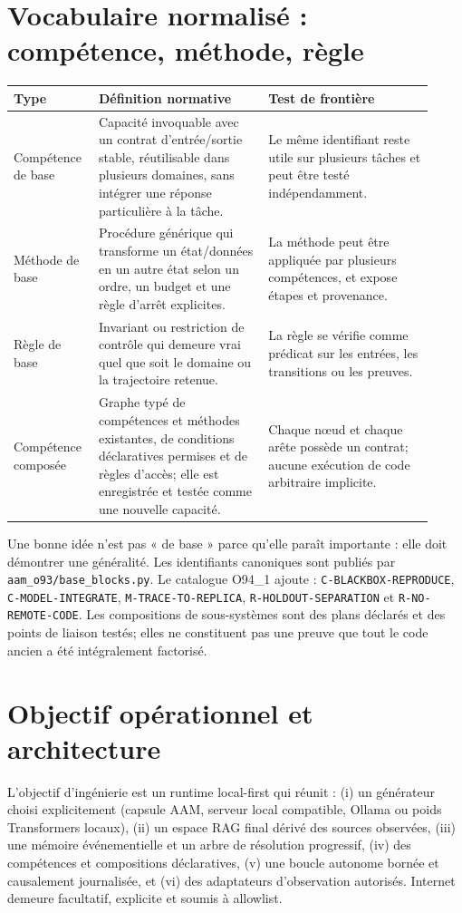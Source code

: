 \documentclass[11pt,a4paper]{article}
\begin{document}
\section{Vocabulaire normalisé : compétence, méthode, règle}
\begin{longtable}{p{0.17\linewidth}p{0.38\linewidth}p{0.37\linewidth}}
\toprule
Type & Définition normative & Test de frontière \\
\midrule
Compétence de base & Capacité invoquable avec un contrat d'entrée/sortie stable, réutilisable dans plusieurs domaines, sans intégrer une réponse particulière à la tâche. & Le même identifiant reste utile sur plusieurs tâches et peut être testé indépendamment. \\
Méthode de base & Procédure générique qui transforme un état/données en un autre état selon un ordre, un budget et une règle d'arrêt explicites. & La méthode peut être appliquée par plusieurs compétences, et expose étapes et provenance. \\
Règle de base & Invariant ou restriction de contrôle qui demeure vrai quel que soit le domaine ou la trajectoire retenue. & La règle se vérifie comme prédicat sur les entrées, les transitions ou les preuves. \\
Compétence composée & Graphe typé de compétences et méthodes existantes, de conditions déclaratives permises et de règles d'accès; elle est enregistrée et testée comme une nouvelle capacité. & Chaque nœud et chaque arête possède un contrat; aucune exécution de code arbitraire implicite. \\
\bottomrule
\end{longtable}
Une bonne idée n'est pas « de base » parce qu'elle paraît importante : elle doit démontrer une généralité. Les identifiants canoniques sont publiés par \texttt{aam\_o93/base\_blocks.py}. Le catalogue O94\_1 ajoute : \texttt{C-BLACKBOX-REPRODUCE}, \texttt{C-MODEL-INTEGRATE}, \texttt{M-TRACE-TO-REPLICA}, \texttt{R-HOLDOUT-SEPARATION} et \texttt{R-NO-REMOTE-CODE}. Les compositions de sous-systèmes sont des plans déclarés et des points de liaison testés; elles ne constituent pas une preuve que tout le code ancien a été intégralement factorisé.

\section{Objectif opérationnel et architecture}
L'objectif d'ingénierie est un runtime local-first qui réunit : (i) un générateur choisi explicitement (capsule AAM, serveur local compatible, Ollama ou poids Transformers locaux), (ii) un espace RAG final dérivé des sources observées, (iii) une mémoire événementielle et un arbre de résolution progressif, (iv) des compétences et compositions déclaratives, (v) une boucle autonome bornée et causalement journalisée, et (vi) des adaptateurs d'observation autorisés. Internet demeure facultatif, explicite et soumis à allowlist.
\end{document}
